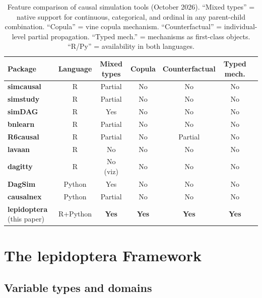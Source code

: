 \documentclass[12pt,a4paper]{article}
\newcommand{\pkg}[1]{\textbf{#1}}
\begin{document}
\begin{table}[ht]
\centering
\caption{Feature comparison of causal simulation tools (October 2026). ``Mixed
types'' = native support for continuous, categorical, and ordinal in any
parent-child combination. ``Copula'' = vine copula mechanism. ``Counterfactual''
= individual-level partial propagation. ``Typed mech.'' = mechanisms as
first-class objects. ``R/Py'' = availability in both languages.}
\label{tab:comparison}
\small\setlength{\tabcolsep}{5pt}
\begin{tabular}{lcccccr}
\toprule
Package & Language & Mixed types & Copula & Counterfactual & Typed mech. \\
\midrule
\pkg{simcausal} \citep{sofrygin2017simcausal} & R & Partial & No & No & No \\
\pkg{simstudy}  \citep{goldfeld2020simstudy}  & R & Partial & No & No & No \\
\pkg{simDAG}    \citep{denz2026simdag}         & R & Yes & No & No & No \\
\pkg{bnlearn}   \citep{scutari2010bnlearn}     & R & Partial & No & No & No \\
\pkg{R6causal}  \citep{tikka2024r6causal}      & R & Partial & No & Partial & No \\
\pkg{lavaan}    \citep{rosseel2012lavaan}       & R & No & No & No & No \\
\pkg{dagitty}   \citep{textor2016dagitty}       & R & No (viz) & No & No & No \\
\pkg{DagSim}    \citep{alhajj2023dagsim}        & Python & Yes & No & No & No \\
\pkg{causalnex} \citep{beaumont2021causalnex}  & Python & Partial & No & No & No \\
\pkg{lepidoptera} (this paper)                 & R+Python & \textbf{Yes} & \textbf{Yes} & \textbf{Yes} & \textbf{Yes} \\
\bottomrule
\end{tabular}
\end{table}

\section{The \pkg{lepidoptera} Framework}
\label{sec:framework}

\subsection{Variable types and domains}
\label{sec:types}
\end{document}
